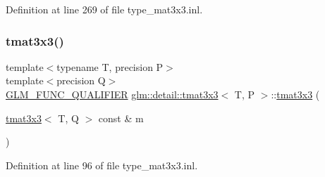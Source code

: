 Definition at line 269 of file type\+\_\+mat3x3.\+inl.

\mbox{\label{structglm_1_1detail_1_1tmat3x3_a2b14034fffb8d3dd7f1d6d24131f7510}} 
\subsubsection{\texorpdfstring{tmat3x3()}{tmat3x3()}\hspace{0.1cm}{\footnotesize\ttfamily [19/22]}}
{\footnotesize\ttfamily template$<$typename T, precision P$>$ \\
template$<$precision Q$>$ \\
\hyperlink{setup_8hpp_a33fdea6f91c5f834105f7415e2a64407}{G\+L\+M\+\_\+\+F\+U\+N\+C\+\_\+\+Q\+U\+A\+L\+I\+F\+I\+ER} \hyperlink{structglm_1_1detail_1_1tmat3x3}{glm\+::detail\+::tmat3x3}$<$ T, P $>$\+::\hyperlink{structglm_1_1detail_1_1tmat3x3}{tmat3x3} (\begin{DoxyParamCaption}\item[{\hyperlink{structglm_1_1detail_1_1tmat3x3}{tmat3x3}$<$ T, Q $>$ const \&}]{m }\end{DoxyParamCaption})}



Definition at line 96 of file type\+\_\+mat3x3.\+inl.

\mbox{\label{structglm_1_1detail_1_1tmat3x3_a6bc248bf277f1e4c97480b964301a9e2}} 
